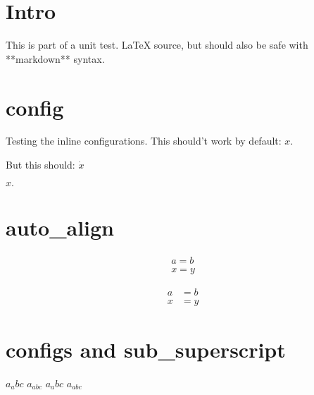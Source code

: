 \documentclass[12pt]{article}
\begin{document}
\section{Intro}
This is part of a unit test. \LaTeX{} source, but should also be safe with **markdown** syntax.

\section{config}
Testing the inline configurations. This should't work by default: $x.$

But this should: $\dot{x}$

$x.$

\section{auto_align}

\begin {align}
a = b \\
x = y
\end{align}

\begin {align}
a &= b \\
x &= y
\end{align}

\section{configs and sub_superscript}
$a_ abc $
$a_ {abc} $
$a_abc$
$a_{abc}$

\end{document}

